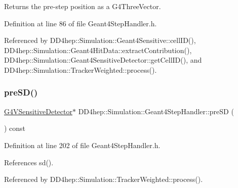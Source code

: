 Returns the pre-\/step position as a G4\+Three\+Vector. 



Definition at line 86 of file Geant4\+Step\+Handler.\+h.



Referenced by D\+D4hep\+::\+Simulation\+::\+Geant4\+Sensitive\+::cell\+I\+D(), D\+D4hep\+::\+Simulation\+::\+Geant4\+Hit\+Data\+::extract\+Contribution(), D\+D4hep\+::\+Simulation\+::\+Geant4\+Sensitive\+Detector\+::get\+Cell\+I\+D(), and D\+D4hep\+::\+Simulation\+::\+Tracker\+Weighted\+::process().

\hypertarget{class_d_d4hep_1_1_simulation_1_1_geant4_step_handler_a7b3384fa3ce4d4465a79aa286371b4bb}{}\label{class_d_d4hep_1_1_simulation_1_1_geant4_step_handler_a7b3384fa3ce4d4465a79aa286371b4bb} 
\subsubsection{\texorpdfstring{pre\+S\+D()}{preSD()}}
{\footnotesize\ttfamily \hyperlink{class_g4_v_sensitive_detector}{G4\+V\+Sensitive\+Detector}$\ast$ D\+D4hep\+::\+Simulation\+::\+Geant4\+Step\+Handler\+::pre\+SD (\begin{DoxyParamCaption}{ }\end{DoxyParamCaption}) const\hspace{0.3cm}{\ttfamily [inline]}}



Definition at line 202 of file Geant4\+Step\+Handler.\+h.



References sd().



Referenced by D\+D4hep\+::\+Simulation\+::\+Tracker\+Weighted\+::process().

\hypertarget{class_d_d4hep_1_1_simulation_1_1_geant4_step_handler_abbe2109ee72c4bd038db33c7f9b55bf1}{}\label{class_d_d4hep_1_1_simulation_1_1_geant4_step_handler_abbe2109ee72c4bd038db33c7f9b55bf1} 
